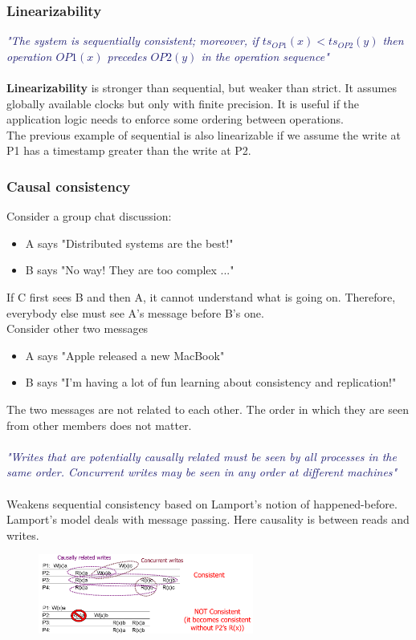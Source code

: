 \documentclass[10pt,a4paper]{article}
\newcommand{\mydefinition}[1]{\textcolor{MidnightBlue}{\textit{"#1"}\\ \\}}
\begin{document}
\subsubsection{Linearizability}
\mydefinition{The system is sequentially consistent; moreover, if $ts_{OP1}(x)<ts_{OP2}(y)$ then operation $OP1(x)$ precedes $OP2(y)$ in the operation sequence}
\textbf{Linearizability} is stronger than sequential, but weaker than strict. It assumes globally available clocks but only with finite precision. It is useful if the application logic needs to enforce some ordering between operations. \\
The previous example of sequential is also linearizable if we assume the write at P1 has a timestamp greater than the write at P2.
\subsubsection{Causal consistency}
Consider a group chat discussion:
\begin{itemize}
	\item A says "Distributed systems are the best!"
	\item B says "No way! They are too complex ..."
\end{itemize}
If C first sees B and then A, it cannot understand what is going on. Therefore, everybody else must see A's message before B's one. \\
Consider other two messages
\begin{itemize}
	\item A says "Apple released a new MacBook"
	\item B says "I'm having a lot of fun learning about consistency and replication!"
\end{itemize}
The two messages are not related to each other. The order in which they are seen from other members does not matter. \\ \\
\mydefinition{Writes that are potentially causally related must be seen by all processes in the same order. Concurrent writes may be seen in any order at different machines}
Weakens sequential consistency based on Lamport's notion of happened-before. Lamport's model deals with message passing. Here causality is between reads and writes.
\begin{figure}[h!]
 \hfill \includegraphics[width=200pt]{images/causal.png}\hspace*{\fill}
  \label{fig:causal}
\end{figure} \pagebreak \\
\end{document}
